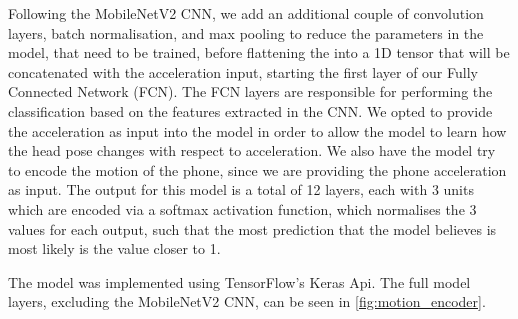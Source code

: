 Following the MobileNetV2 CNN, we add an additional couple of convolution layers, batch normalisation, and max pooling to reduce the parameters in the model, that need to be trained, before flattening the into a 1D tensor that will be concatenated with the acceleration input, starting the first layer of our Fully Connected Network (FCN).
The FCN layers are responsible for performing the classification based on the features extracted in the CNN. 
We opted to provide the acceleration as input into the model in order to allow the model to learn how the head pose changes with respect to acceleration.
We also have the model try to encode the motion of the phone, since we are providing the phone acceleration as input.
The output for this model is a total of 12 layers, each with 3 units which are encoded via a softmax activation function, which normalises the 3 values for each output, such that the most prediction that the model believes is most likely is the value closer to 1.

The model was implemented using TensorFlow's Keras Api.
The full model layers, excluding the MobileNetV2 CNN, can be seen in \autoref{fig:motion_encoder}.




